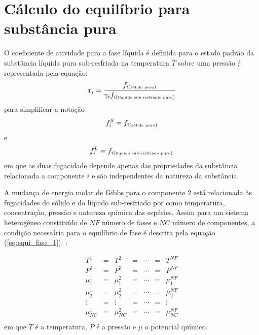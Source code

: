 	\section{Cálculo do equilíbrio para substância pura}
	
	\hspace{5mm} O coeficiente de atividade para a fase líquida é definida para o estado padrão da substância líquida pura sub-resfriada na temperatura $T$ sobre uma pressão é representada pela equação:
	\begin{equation}\label{eq:atividade_1}x_i=\frac{f_{i(\mbox{\tiny sólido puro})}}{\gamma_{i}f_{i(\mbox{\tiny líquido sub-resfriado puro})}}
	\end{equation}
	para simplificar a notação
	\begin{equation*}
	f_{i}^{S}=f_{i(\mbox{\tiny sólido puro})}
	\end{equation*}
	e
	\begin{equation*}
	f_{i}^{L}=f_{i(\mbox{\tiny líquido sub-resfriado puro})}
	\end{equation*}
	em que as duas fugacidade depende apenas das propriedades da substância relacionada a componente $i$ e são independentes da natureza da substância. %
	
A mudança de energia molar de Gibbs para o componente 2 está relacionada às fugacidades do sólido e do líquido sub-resfriado por como temperatura, concentração, pressão e natureza química das espécies. Assim para um sistema heterogêneo constituído de $NF$ número de fases e $NC$ número de componentes, a condição necessária para o equilíbrio de fase é descrita pela equação (\ref{eq:equi_fase_1}): \cite{Rocha2011,Sandlel,Barbosa2012,Prausnitz}:

\begin{equation}\label{eq:equi_fase_1}
	\begin{array}{ccccccc}
    	T^{1}&=&T^{2}&=&\cdots&=&T^{NF}\\
	P^{1}&=&P^{2}&=&\cdots&=&P^{NF}\\
	\mu_{1}^{1}&=&\mu_{1}^{2}&=&\cdots&=&\mu_{1}^{NF}\\
	\mu_{2}^{1}&=&\mu_{2}^{2}&=&\cdots&=&\mu_{2}^{NF}\\
	\vdots&=&\vdots&=&\cdots&=&\vdots\\
	\mu_{NC}^{1}&=&\mu_{NC}^{2}&=&\cdots&=&\mu_{NC}^{NF}\\
	\end{array} 
\end{equation}
em que $T$ é a temperatura, $P$ é a pressão e $\mu$ o potencial químico.

